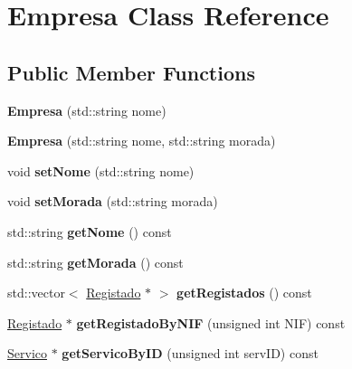 \hypertarget{class_empresa}{}\section{Empresa Class Reference}
\label{class_empresa}
\subsection*{Public Member Functions}
\begin{DoxyCompactItemize}
\item 
\mbox{\label{class_empresa_a246d93027070baa8adfd65d16aa4199d}} 
{\bfseries Empresa} (std\+::string nome)
\item 
\mbox{\label{class_empresa_a84deac5a4a2151c58759f89167a45124}} 
{\bfseries Empresa} (std\+::string nome, std\+::string morada)
\item 
\mbox{\label{class_empresa_a7c9543608b1bc26bab8f4ad8c6d28128}} 
void {\bfseries set\+Nome} (std\+::string nome)
\item 
\mbox{\label{class_empresa_a5bd86d8ec03de652cfd11797de5bbe22}} 
void {\bfseries set\+Morada} (std\+::string morada)
\item 
\mbox{\label{class_empresa_ae917f6b8a8be9316e1dd553b2ccb6332}} 
std\+::string {\bfseries get\+Nome} () const
\item 
\mbox{\label{class_empresa_a4ba5753ee333e062a47615b0a2c442c2}} 
std\+::string {\bfseries get\+Morada} () const
\item 
\mbox{\label{class_empresa_a7625bb6835dec408801b92e0f6ae89bb}} 
std\+::vector$<$ \hyperlink{class_registado}{Registado} $\ast$ $>$ {\bfseries get\+Registados} () const
\item 
\mbox{\label{class_empresa_a35b2ad7ce666b30d99edd10c691b335a}} 
\hyperlink{class_registado}{Registado} $\ast$ {\bfseries get\+Registado\+By\+N\+IF} (unsigned int N\+IF) const
\item 
\mbox{\label{class_empresa_a6057325975eae633f66ba2504ac8dd09}} 
\hyperlink{class_servico}{Servico} $\ast$ {\bfseries get\+Servico\+By\+ID} (unsigned int serv\+ID) const

\end{DoxyCompactItemize}
